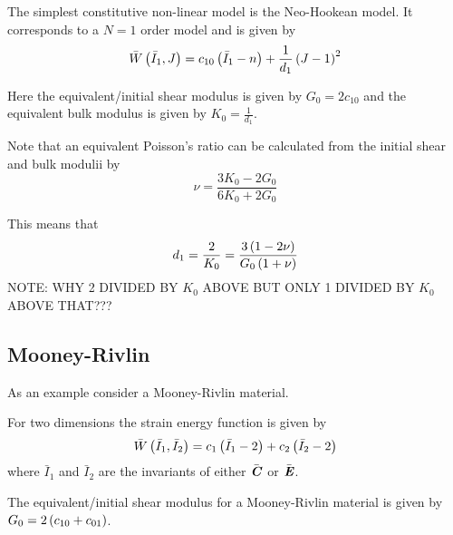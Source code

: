 The simplest constitutive non-linear model is the Neo-Hookean model. It corresponds to a $N=1$ order model and is given by
\begin{equation}
    \bar{W}\left( \bar{I}_{1},J \right) =c_{10}\left( \bar{I}_{1}-n \right)+\dfrac{1}{d_{1}}\left( J-1 \right)^{2}
\end{equation}

Here the equivalent/initial shear modulus is given by $G_{0}=2c_{10}$ and the equivalent bulk modulus is given by $K_{0}=\frac{1}{d_{1}}$.

Note that an equivalent Poisson's ratio can be calculated from the initial shear and bulk modulii by
\begin{equation}
  \nu=\frac{3K_{0}-2G_{0}}{6K_{0}+2G_{0}}
\end{equation}

This means that
\begin{equation}
  d_{1}=\dfrac{2}{K_{0}}=\dfrac{3\left( 1-2\nu \right)}{G_{0}\left( 1+\nu \right)}
\end{equation}
NOTE: WHY 2 DIVIDED BY $K_{0}$ ABOVE BUT ONLY 1 DIVIDED BY $K_{0}$ ABOVE THAT???
  
\subsection{Mooney-Rivlin}

As an example consider a Mooney-Rivlin material.

For two dimensions the strain energy function is given by
\begin{equation}
   \bar{W}\left( \bar{I}_{1},\bar{I}_{2} \right) =c_{1}\left( \bar{I}_{1}-2 \right)+c_{2}\left( \bar{I}_{2}-2 \right)
\end{equation}
where $\bar{I}_{1}$ and $\bar{I}_{2}$ are the invariants of either $\bar{\boldsymbol{\mathit{C}}}$ or $\bar{\boldsymbol{\mathit{E}}}$.

The equivalent/initial shear modulus for a Mooney-Rivlin material is given by $G_{0}=2\left( c_{10}+c_{01} \right)$.

